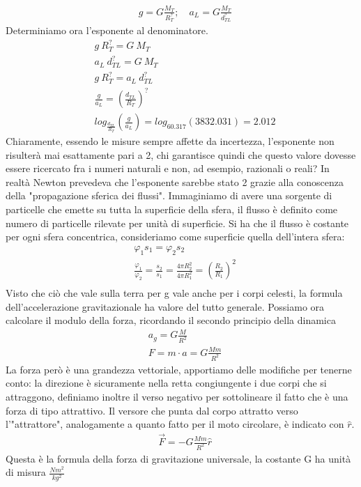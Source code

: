 \documentclass[10pt,a4paper]{article}
\begin{document}
\begin{align*}
	&g = G \frac{M_T}{R_T^?};\quad a_L = G \frac{M_T}{d_{TL}^?}
\end{align*}
Determiniamo ora l'esponente al denominatore. 
\begin{align*}
	&g\ R_T^? = G\ M_T\\
	&a_L\ d_{TL}^? = G\ M_T\\
	& g\ R_T^? = a_L\ d_{TL}^?\\
	&\frac{g}{a_L} = (\frac{d_{TL}}{R_T})^?\\
	&log_{\frac{d_{TL}}{R_T}}(\frac{g}{a_L}) = log_{60.317}(3832.031) = 2.012
\end{align*}
Chiaramente, essendo le misure sempre affette da incertezza, l'esponente non risulterà mai esattamente pari a 2, chi garantisce quindi che questo valore dovesse essere ricercato fra i numeri naturali e non, ad esempio, razionali o reali? In realtà Newton prevedeva che l'esponente sarebbe stato 2 grazie alla conoscenza della "propagazione sferica dei flussi". Immaginiamo di avere una sorgente di particelle che emette su tutta la superficie della sfera, il flusso è definito come numero di particelle rilevate per unità di superficie. Si ha che il flusso è costante per ogni sfera concentrica, consideriamo come superficie quella dell'intera sfera:
\begin{align*}
	&\varphi_1 s_1 = \varphi_2 s_2\\
	&\frac{\varphi_1 }{\varphi_2} = \frac{s_2}{s_1} =\frac{4\pi R_2^2}{4\pi R_1^2}= (\frac{R_2}{R_1})^2\\
\end{align*}
Visto che ciò che vale sulla terra per g vale anche per i corpi celesti, la formula dell'accelerazione gravitazionale ha valore del tutto generale. Possiamo ora calcolare il modulo della forza, ricordando il secondo principio della dinamica
\begin{align*}
	&a_g = G \frac{M}{R^2}\\
	&F = m\cdot a = G \frac{M m}{R^2}
\end{align*}
La forza però è una grandezza vettoriale, apportiamo delle modifiche per tenerne conto: la direzione è sicuramente nella retta congiungente i due corpi che si attraggono, definiamo inoltre il verso negativo per sottolineare il fatto che è una forza di tipo attrattivo. Il versore che punta dal corpo attratto verso l'"attrattore", analogamente a quanto fatto per il moto circolare, è indicato con  $\hat{r}$.
\begin{align}\label{eq:forzagravitazionale}
	&\vec{F} = - G \frac{M m}{R^2} \hat{r}
\end{align}
 Questa è la formula della forza di gravitazione universale, la costante G ha unità di misura $\frac{N m^2}{kg^2}$
\end{document}

